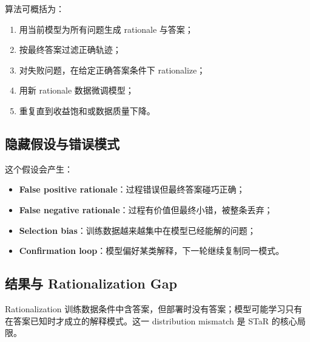 
算法可概括为：

\begin{enumerate}
    \item 用当前模型为所有问题生成 rationale 与答案；
    \item 按最终答案过滤正确轨迹；
    \item 对失败问题，在给定正确答案条件下 rationalize；
    \item 用新 rationale 数据微调模型；
    \item 重复直到收益饱和或数据质量下降。
\end{enumerate}

\subsection{隐藏假设与错误模式}


这个假设会产生：

\begin{itemize}
    \item \textbf{False positive rationale}：过程错误但最终答案碰巧正确；
    \item \textbf{False negative rationale}：过程有价值但最终小错，被整条丢弃；
    \item \textbf{Selection bias}：训练数据越来越集中在模型已经能解的问题；
    \item \textbf{Confirmation loop}：模型偏好某类解释，下一轮继续复制同一模式。
\end{itemize}

\subsection{结果与 Rationalization Gap}



Rationalization 训练数据条件中含答案，但部署时没有答案；模型可能学习只有在答案已知时才成立的解释模式。这一 distribution mismatch 是 STaR 的核心局限。

